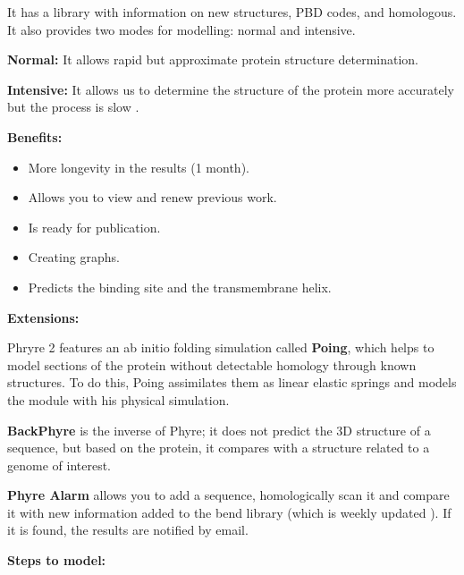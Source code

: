 \documentclass[11pt, letterpaper, english]{article}
\begin{document}
        \par{It has a library with information on new structures, PBD codes, and homologous. It also provides two modes for modelling: normal and intensive.}
            \par{\textbf{Normal:} It allows rapid but approximate protein structure determination.}
            \par{\textbf{Intensive:} It allows us to determine the structure of the protein more accurately but the process is slow .}
        \par{\textbf{Benefits:}}
        \begin{itemize}
            \item More longevity in the results (1 month).
            \item  Allows you to view and renew previous work.
            \item Is ready for publication.
            \item Creating graphs.
            \item Predicts the binding site and the transmembrane helix.
        \end{itemize}
        \par{\textbf{Extensions:}}
        \par{Phryre 2 features an ab initio folding simulation called \textbf{Poing}, which helps to model sections of the protein without detectable homology through known structures. To do this, Poing assimilates them as linear elastic springs and models the module with his physical simulation.}
        \par{\textbf{BackPhyre} is the inverse of Phyre; it does not predict the 3D structure of a sequence, but based on the protein, it compares with a structure related to a genome of interest.}
        \par{\textbf{Phyre Alarm} allows you to add a sequence, homologically scan it and compare it with new information added to the bend library (which is weekly updated ). If it is found, the results are notified by email.}
        \par{\textbf{Steps to model:}}
\end{document}
